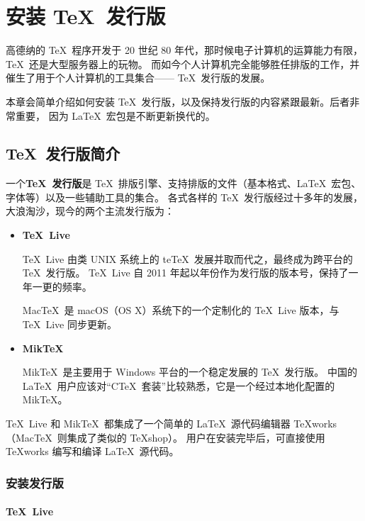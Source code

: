 \chapter{安装 \protect\TeX\ 发行版}\label{app:install}

\begin{intro}
高德纳的 \TeX\ 程序开发于 20 世纪 80 年代，那时候电子计算机的运算能力有限，\TeX\ 还是大型服务器上的玩物。
而如今个人计算机完全能够胜任排版的工作，并催生了用于个人计算机的工具集合—— \TeX\ 发行版的发展。

本章会简单介绍如何安装 \TeX\ 发行版，以及保持发行版的内容紧跟最新。后者非常重要，
因为 \LaTeX\ 宏包是不断更新换代的。
\end{intro}

\section{\protect\TeX\ 发行版简介}\label{sec:dists}

一个\textbf{\TeX\ 发行版}是 \TeX\ 排版引擎、支持排版的文件（基本格式、\LaTeX\ 宏包、字体等）以及一些辅助工具的集合。
各式各样的 \TeX\ 发行版经过十多年的发展，大浪淘沙，现今的两个主流发行版为：
\begin{itemize}
  \item \textbf{\TeX\ Live}\par
  \TeX\ Live 由类 UNIX 系统上的 te\TeX\ 发展并取而代之，最终成为跨平台的 \TeX\ 发行版。
  \TeX\ Live 自 2011 年起以年份作为发行版的版本号，保持了一年一更的频率。

  Mac\TeX\ 是 macOS（OS X）系统下的一个定制化的 \TeX\ Live 版本，与 \TeX\ Live 同步更新。

  \item \textbf{Mik\TeX}\par
  Mik\TeX\ 是主要用于 Windows 平台的一个稳定发展的 \TeX\ 发行版。
  中国的 \LaTeX\ 用户应该对“C\TeX\ 套装”比较熟悉，它是一个经过本地化配置的 Mik\TeX 。
\end{itemize}

\TeX\ Live 和 Mik\TeX\ 都集成了一个简单的 \LaTeX\ 源代码编辑器 \TeX works（Mac\TeX\ 则集成了类似的 \TeX shop）。
用户在安装完毕后，可直接使用 \TeX works 编写和编译 \LaTeX\ 源代码。

\subsection{安装发行版}\label{subsec:install-dists}

\subsubsection{\TeX\ Live}

